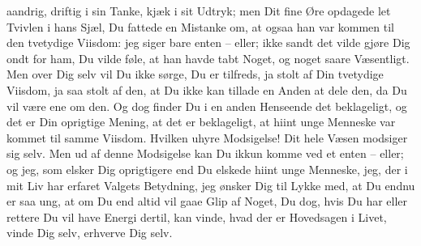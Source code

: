 \documentclass[12pt,a4paper]{article}
\begin{document}
aandrig, driftig i sin Tanke, kjæk i sit Udtryk; men Dit fine Øre opdagede let Tvivlen i hans Sjæl, Du fattede en Mistanke om, at ogsaa han var kommen til den tvetydige Viisdom: jeg siger bare enten – eller; ikke sandt det vilde gjøre Dig ondt for ham, Du vilde føle, at han havde tabt Noget, og noget saare Væsentligt. Men over Dig selv vil Du ikke sørge, Du er tilfreds, ja stolt af Din tvetydige Viisdom, ja saa stolt af den, at Du ikke kan tillade en Anden at dele den, da Du vil være ene om den. Og dog finder Du i en anden Henseende det beklageligt, og det er Din oprigtige Mening, at det er beklageligt, at hiint unge Menneske var kommet til samme Viisdom. Hvilken uhyre Modsigelse! Dit hele Væsen modsiger sig selv. Men ud af denne Modsigelse kan Du ikkun komme ved et enten – eller; og jeg, som elsker Dig oprigtigere end Du elskede hiint unge Menneske, jeg, der i mit Liv har erfaret Valgets Betydning, jeg ønsker Dig til Lykke med, at Du endnu er saa ung, at om Du end altid vil gaae Glip af Noget, Du dog, hvis Du har eller rettere Du vil have Energi dertil, kan vinde, hvad der er Hovedsagen i Livet, vinde Dig selv, erhverve Dig selv.
\end{document}
